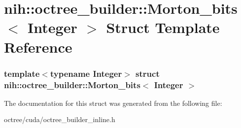 \hypertarget{structnih_1_1octree__builder_1_1_morton__bits}{
\section{nih\-:\-:octree\-\_\-builder\-:\-:\-Morton\-\_\-bits$<$ \-Integer $>$ \-Struct \-Template \-Reference}
\label{structnih_1_1octree__builder_1_1_morton__bits}
}
\subsubsection*{template$<$typename Integer$>$ struct nih\-::octree\-\_\-builder\-::\-Morton\-\_\-bits$<$ Integer $>$}



\-The documentation for this struct was generated from the following file\-:\begin{DoxyCompactItemize}
\item 
octree/cuda/octree\-\_\-builder\-\_\-inline.\-h\end{DoxyCompactItemize}

